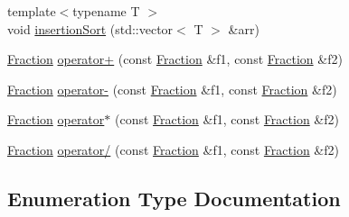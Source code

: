 \begin{DoxyCompactItemize}
\item 
{\footnotesize template$<$typename T $>$ }\\void \hyperlink{namespace_alg_lib_aaa2cce44d615ee89d16ed8f5595189d4}{insertion\+Sort} (std\+::vector$<$ T $>$ \&arr)
\item 
\hyperlink{class_alg_lib_1_1_fraction}{Fraction} \hyperlink{namespace_alg_lib_ade570114b2ba76f3c9742dd9ca92387c}{operator+} (const \hyperlink{class_alg_lib_1_1_fraction}{Fraction} \&f1, const \hyperlink{class_alg_lib_1_1_fraction}{Fraction} \&f2)
\item 
\hyperlink{class_alg_lib_1_1_fraction}{Fraction} \hyperlink{namespace_alg_lib_a8d6284ffd8dfa09154f65a0957ac6801}{operator-\/} (const \hyperlink{class_alg_lib_1_1_fraction}{Fraction} \&f1, const \hyperlink{class_alg_lib_1_1_fraction}{Fraction} \&f2)
\item 
\hyperlink{class_alg_lib_1_1_fraction}{Fraction} \hyperlink{namespace_alg_lib_aabcf6f54d813c4b6d701163009d268d9}{operator$\ast$} (const \hyperlink{class_alg_lib_1_1_fraction}{Fraction} \&f1, const \hyperlink{class_alg_lib_1_1_fraction}{Fraction} \&f2)
\item 
\hyperlink{class_alg_lib_1_1_fraction}{Fraction} \hyperlink{namespace_alg_lib_ab98deb23af06c328aede79f2fe4d2563}{operator/} (const \hyperlink{class_alg_lib_1_1_fraction}{Fraction} \&f1, const \hyperlink{class_alg_lib_1_1_fraction}{Fraction} \&f2)
\end{DoxyCompactItemize}


\subsection{Enumeration Type Documentation}
